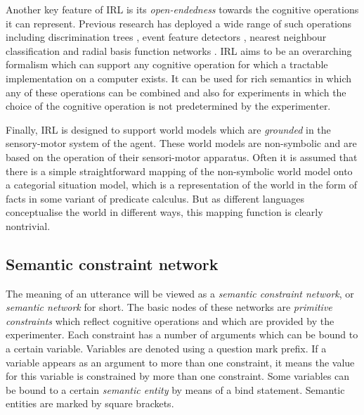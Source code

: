 Another key feature of IRL is its \emph{open-endedness} towards the
cognitive operations it can represent. Previous research has deployed
a wide range of such operations including discrimination trees
\citep{steels96perceptually}, event feature detectors
\citep{siskind01grounding}, nearest neighbour classification
\citep{belpaeme05explaining} and radial basis function networks
\citep{steels05coordinating}.  IRL aims to be an overarching formalism
which can support any cognitive operation for which a tractable
implementation on a computer exists. It can be used for rich semantics
in which any of these operations can be combined and also for
experiments in which the choice of the cognitive operation is not
predetermined by the experimenter.

Finally, IRL is designed to support world models which are
\emph{grounded} in the sensory-motor system of the agent. These world
models are non-symbolic and are based on the operation of their
sensori-motor apparatus. Often \citep[e.g.][]{batali02negotiation,
  smith03iterated, wellens08flexible} it is assumed that there is a
simple straightforward mapping of the non-symbolic world model onto a
categorial situation model, which is a representation of the world in
the form of facts in some variant of predicate calculus. But as
different languages conceptualise the world in different ways, this
mapping function is clearly nontrivial.

\subsection{Semantic constraint network}
\label{s:semantic-constraint-network}

The meaning of an utterance will be viewed as a \emph{semantic
  constraint network}, or \emph{semantic network} for short. The basic
nodes of these networks are \emph{primitive
  constraints} which reflect cognitive
operations and which are provided by the experimenter.  Each
constraint has a number of arguments which can be bound to a certain
variable. Variables are denoted using a question mark prefix. If a
variable appears as an argument to more than one constraint, it means
the value for this variable is constrained by more than one
constraint. Some variables can be bound to a certain \emph{semantic
  entity} by means of a bind
statement. Semantic entities are marked by square brackets.

